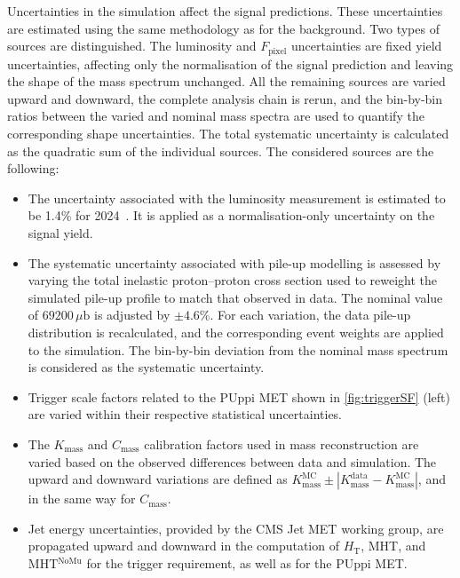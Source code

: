 Uncertainties in the simulation affect the signal predictions. These uncertainties are estimated using the same methodology as for the background. Two types of sources are distinguished. The luminosity and $F_\textrm{pixel}$ uncertainties are fixed yield uncertainties, affecting only the normalisation of the signal prediction and leaving the shape of the mass spectrum unchanged. All the remaining sources are varied upward and downward, the complete analysis chain is rerun, and the bin-by-bin ratios between the varied and nominal mass spectra are used to quantify the corresponding shape uncertainties. The total systematic uncertainty is calculated as the quadratic sum of the individual sources. The considered sources are the following:
\begin{itemize}
    \item The uncertainty associated with the luminosity measurement is estimated to be 1.4\% for 2024~\cite{CMS-DP-2026-003}. It is applied as a normalisation-only uncertainty on the signal yield.
    \item The systematic uncertainty associated with pile-up modelling is assessed by varying the total inelastic proton--proton cross section used to reweight the simulated pile-up profile to match that observed in data. The nominal value of $69200\,\mu\textrm{b}$ is adjusted by $\pm4.6\%$. For each variation, the data pile-up distribution is recalculated, and the corresponding event weights are applied to the simulation. The bin-by-bin deviation from the nominal mass spectrum is considered as the systematic uncertainty.
    \item Trigger scale factors related to the PUppi MET shown in \cref{fig:triggerSF} (left) are varied within their respective statistical uncertainties.
    \item The $K_\textrm{mass}$ and $C_\textrm{mass}$ calibration factors used in mass reconstruction are varied based on the observed differences between data and simulation. The upward and downward variations are defined as $K_\textrm{mass}^\textrm{MC} \pm |K_\textrm{mass}^\textrm{data} - K_\textrm{mass}^\textrm{MC}|$, and in the same way for $C_\textrm{mass}$.
    \item Jet energy uncertainties, provided by the CMS Jet MET working group, are propagated upward and downward in the computation of $H_{\mathrm{T}}$, MHT, and MHT$^\mathrm{NoMu}$ for the trigger requirement, as well as for the PUppi MET.

\end{itemize}
